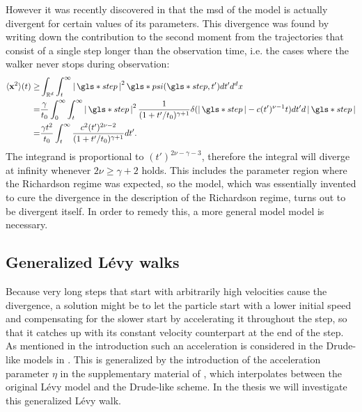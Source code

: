 %
%

However it was recently discovered in 
\cite{radons2018} 
that the \gls*{msd} of the model is actually divergent for certain values of its parameters. This divergence was found by writing down the contribution to the second moment from the trajectories that consist of a single step longer than the observation time, i.e. the cases where the walker never stops during observation:
%
\begin{align}
\mean{\ve{x}^2}(t) \geq& \int_{\mathbb{R}^d} \int_{t}^{\infty} \abs{\gls*{step}}^{2} \gls*{psi}(\gls*{step},t') dt' d^{d}x \\
=& \frac{\gamma}{t_0} \int_{0}^{\infty} \int_{t}^{\infty} \abs{\gls*{step}}^{2}  \frac{1}{(1+t'/t_0)^{\gamma+1}}  \delta(\abs{\gls*{step}} - c (t')^{\nu-1}t)  dt' d\abs{\gls*{step}} \\
=& \frac{\gamma t^2}{t_0}  \int_{t}^{\infty}   \frac{c^2 (t')^{2\nu-2}}{(1+t'/t_0)^{\gamma+1}}    dt'  .
\end{align}
%
The integrand is proportional to $(t')^{2\nu-\gamma-3}$, therefore the integral will diverge at infinity whenever $2 \nu \geq \gamma +2$ holds. This includes the parameter region where the Richardson regime was expected, so the model,  which was essentially invented to cure the divergence in the description of the Richardson regime, turns out to be divergent itself. In order to remedy this, a more general model model is necessary.

\subsection{Generalized L\'evy walks}

Because very long steps that start with arbitrarily high velocities cause the divergence, a solution might be to let the particle start with a lower initial speed and compensating for the slower start by accelerating it throughout the step, so that it catches up with its constant velocity counterpart at the end of the step. \\
As mentioned in the introduction such an acceleration is considered in the Drude-like models in 
\cite{schulz1997, BarkaiKlafterBuch}. 
This is generalized by the introduction of the acceleration parameter $\eta$ in the supplementary material of 
\cite{radons2018}, 
which interpolates between the original L\'evy model and the Drude-like scheme. In the thesis we will investigate this generalized L\'evy walk.


